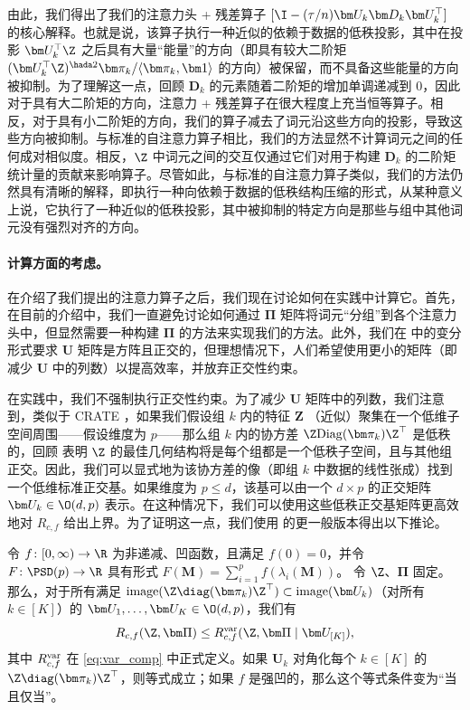 \documentclass[../../book-main_zh.tex]{subfiles}
\begin{document}
由此，我们得出了我们的注意力头 + 残差算子 $[\I - (\tau/n)\bm U_{k}\bm D_{k}\bm U_{k}^{\top}]$ 的核心解释。也就是说，该算子执行一种近似的依赖于数据的低秩投影，其中在投影 $\bm
U_k^\top \Z$ 之后具有大量“能量”的方向（即具有较大二阶矩 $(\bm
    U_{k}^{\top}\Z)^{\hada 2}\bm \pi_k / \langle \bm \pi_{k}, \bm
1\rangle$ 的方向）被保留，而不具备这些能量的方向被抑制。为了理解这一点，回顾 $\bm D_k$ 的元素随着二阶矩的增加单调递减到 0，因此对于具有大二阶矩的方向，注意力 + 残差算子在很大程度上充当恒等算子。相反，对于具有小二阶矩的方向，我们的算子减去了词元沿这些方向的投影，导致这些方向被抑制。与标准的自注意力算子相比，我们的方法显然不计算词元之间的任何成对相似度。相反，$\Z$ 中词元之间的交互仅通过它们对用于构建 $\bm D_{k}$ 的二阶矩统计量的贡献来影响算子。尽管如此，与标准的自注意力算子类似，我们的方法仍然具有清晰的解释，即执行一种向依赖于数据的低秩结构压缩的形式，从某种意义上说，它执行了一种近似的低秩投影，其中被抑制的特定方向是那些与组中其他词元没有强烈对齐的方向。

\paragraph{计算方面的考虑。} 在介绍了我们提出的注意力算子之后，我们现在讨论如何在实践中计算它。首先，在目前的介绍中，我们一直避免讨论如何通过 $\bm\Pi$ 矩阵将词元“分组”到各个注意力头中，但显然需要一种构建 $\bm\Pi$ 的方法来实现我们的方法。此外，我们在  中的变分形式要求 $\bm U$ 矩阵是方阵且正交的，但理想情况下，人们希望使用更小的矩阵（即减少 $\bm U$ 中的列数）以提高效率，并放弃正交性约束。

在实践中，我们不强制执行正交性约束。为了减少 $\bm U$ 矩阵中的列数，我们注意到，类似于 CRATE \citep{yu2023white}，如果我们假设组 \(k\) 内的特征 $\bm Z$ （近似）聚集在一个低维子空间周围——假设维度为 \(p\)——那么组 \(k\) 内的协方差 \(\Z\mathrm{Diag}(\bm
\pi_{k})\Z^{\top}\) 是低秩的，回顾 \cite{yu2020learning} 表明 $\Z$ 的最佳几何结构将是每个组都是一个低秩子空间，且与其他组正交。因此，我们可以显式地为该协方差的像（即组 \(k\) 中数据的线性张成）找到一个低维标准正交基。如果维度为 $p \leq d$，该基可以由一个 $d\times p$ 的正交矩阵 $\bm U_k \in \O(d,
p)$ 表示。在这种情况下，我们可以使用这些低秩正交基矩阵更高效地对 \(R_{c,f}\) 给出上界。为了证明这一点，我们使用  的更一般版本得出以下推论。
\begin{corollary}\label{cor:var_concave_logdet}
    令 \(f \colon [0, \infty) \to \R\) 为非递减、凹函数，且满足 \(f(0) = 0\)，并令 \(F \colon \PSD(p) \to \R\) 具有形式 \(F(\bm M) = \sum_{i = 1}^{p}f(\lambda_{i}(\bm M))\)。
    令 \(\Z\)、\(\bm \Pi\) 固定。那么，对于所有满足 \(\mathrm{image}(\Z\diag(\bm \pi_{k})\Z^{\top}) \subset
    \mathrm{image}(\bm U_{k})\)（对所有 \(k \in [K]\)）的 \(\bm U_{1},
    \dots, \bm U_{K} \in \O(d, p)\)，我们有
    \begin{equation}
        R_{c, f}(\Z, \bm\Pi) \leq R_{c, f}^{\rm var}(\Z, \bm\Pi \mid
        \bm U_{[K]}),
    \end{equation}
    其中 \(R_{c, f}^{\rm var}\) 在 \eqref{eq:var_comp} 中正式定义。如果 \(\bm U_{k}\) 对角化每个 \(k \in [K]\) 的 \(\Z\diag(\bm \pi_{k})\Z^{\top}\)，则等式成立；如果 \(f\) 是强凹的，那么这个等式条件变为“当且仅当”。
\end{corollary}
\end{document}
